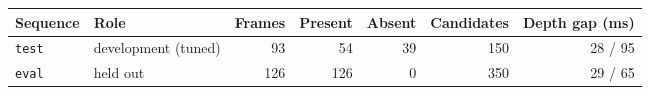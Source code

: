 \begin{tabular}{llrrrrr}
\toprule
Sequence & Role & Frames & Present & Absent & Candidates & Depth gap (ms) \\
\midrule
\texttt{test} & development (tuned) & 93 & 54 & 39 & 150 & 28 / 95 \\
\texttt{eval} & held out & 126 & 126 & 0 & 350 & 29 / 65 \\
\bottomrule
\end{tabular}
